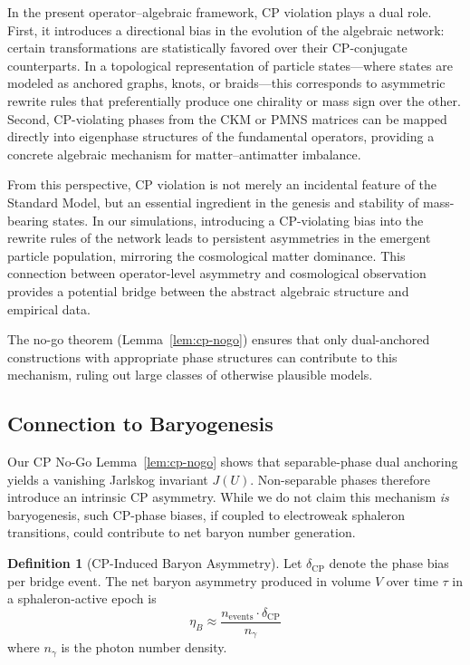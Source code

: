 \documentclass[11pt]{article}
\theoremstyle{plain}
\theoremstyle{definition}
\newtheorem{definition}[theorem]{Definition}
\begin{document}
In the present operator–algebraic framework, CP violation plays a dual role. First, it introduces a directional bias in the evolution of the algebraic network: certain transformations are statistically favored over their CP-conjugate counterparts. In a topological representation of particle states---where states are modeled as anchored graphs, knots, or braids---this corresponds to asymmetric rewrite rules that preferentially produce one chirality or mass sign over the other. Second, CP-violating phases from the CKM or PMNS matrices can be mapped directly into eigenphase structures of the fundamental operators, providing a concrete algebraic mechanism for matter–antimatter imbalance.

From this perspective, CP violation is not merely an incidental feature of the Standard Model, but an essential ingredient in the genesis and stability of mass-bearing states. In our simulations, introducing a CP-violating bias into the rewrite rules of the network leads to persistent asymmetries in the emergent particle population, mirroring the cosmological matter dominance. This connection between operator-level asymmetry and cosmological observation provides a potential bridge between the abstract algebraic structure and empirical data.

The no-go theorem (Lemma~\ref{lem:cp-nogo}) ensures that only dual-anchored constructions with appropriate phase structures can contribute to this mechanism, ruling out large classes of otherwise plausible models.

\subsection{Connection to Baryogenesis}

Our CP No-Go Lemma~\ref{lem:cp-nogo} shows that separable-phase dual anchoring yields a vanishing Jarlskog invariant $J(U)$. Non-separable phases therefore introduce an intrinsic CP asymmetry. While we do not claim this mechanism \emph{is} baryogenesis, such CP-phase biases, if coupled to electroweak sphaleron transitions, could contribute to net baryon number generation.

\begin{definition}[CP-Induced Baryon Asymmetry]
  Let $\delta_{\text{CP}}$ denote the phase bias per bridge event. The net baryon asymmetry produced in volume $V$ over time $\tau$ in a sphaleron-active epoch is
  \begin{equation}
    \eta_B \approx \frac{n_{\text{events}} \cdot \delta_{\text{CP}}}{n_\gamma}
  \end{equation}
  where $n_\gamma$ is the photon number density.
\end{definition}
\end{document}
